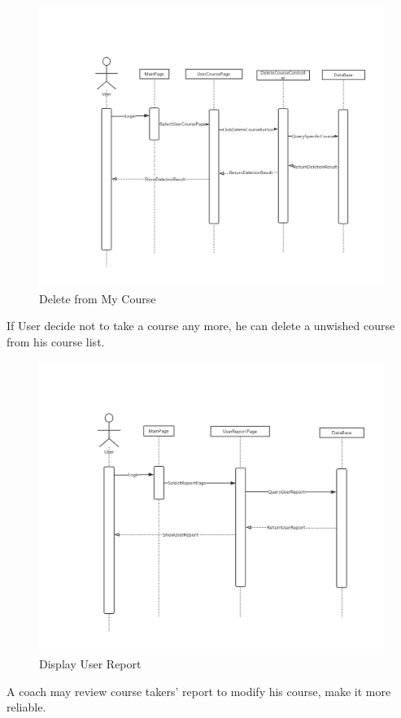 \documentclass[16pt]{scrreprt}
\begin{document}
\begin{figure}[H]
    \includegraphics[width=\linewidth]{./FuncPhoto/11.png}   
    \caption{Delete from My Course}
\end{figure}
If User decide not to take a course any more, he can delete a unwished course from his course list.



\begin{figure}[H]
    \includegraphics[width=\linewidth]{./FuncPhoto/12.png}   
    \caption{Display User Report}
\end{figure}
A coach may review course takers' report to modify his course, make it more reliable.
\end{document}
